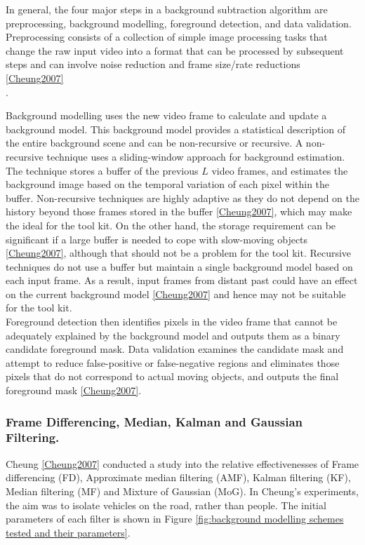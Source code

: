 In general, the four major steps in a background subtraction algorithm are preprocessing, background modelling, foreground detection, and data validation.
Preprocessing consists of a collection of simple image processing tasks that change the raw input video into a format that can be processed by subsequent steps and can involve noise reduction and frame size/rate reductions \ref{Cheung2007}\\.

Background modelling uses the new video frame to calculate and update a background model.
This background model provides a statistical description of the entire background scene and can be non-recursive or recursive. 
A non-recursive technique uses a sliding-window approach for background estimation. 
The technique stores a buffer of the previous $L$ video frames, and estimates the background image based on the temporal variation of each pixel within the buffer.
Non-recursive techniques are highly adaptive as they do not depend on the history beyond those frames stored in the buffer \ref{Cheung2007}, which may make the ideal for the tool kit.
On the other hand, the storage requirement can be significant if a large buffer
is needed to cope with slow-moving objects \ref{Cheung2007}, although that should not be a problem for the tool kit. Recursive techniques do not use a buffer but maintain a single background model based on each input frame. As a result, input frames from distant past could have an effect on the current background model \ref{Cheung2007} and hence may not be suitable for the tool kit.\\

Foreground detection then identifies pixels in the video frame that cannot be adequately explained by the background model and outputs them as a binary candidate foreground mask. 
Data validation examines the candidate mask and attempt to reduce false-positive or false-negative regions and eliminates those pixels that do not correspond to actual moving objects, and outputs the final foreground mask \ref{Cheung2007}.\\

\subsubsection{Frame Differencing, Median, Kalman and Gaussian Filtering.}
Cheung \ref{Cheung2007} conducted a study into the relative effectivenesses of Frame differencing (FD), Approximate median filtering (AMF), Kalman filtering (KF), Median filtering (MF) and Mixture of Gaussian (MoG). In Cheung's experiments, the aim was to isolate vehicles on the road, rather than people. The initial parameters of each filter is shown in Figure \ref{fig:background modelling schemes tested and their parameters}.\\

